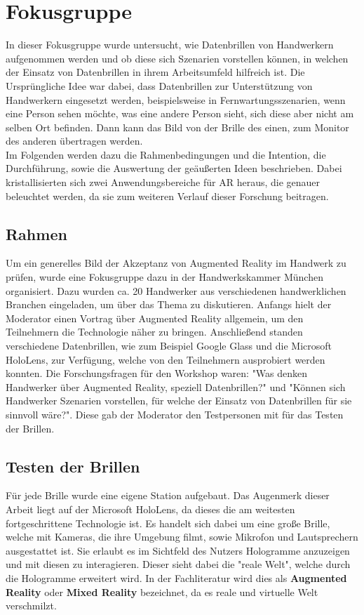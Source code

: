 \chapter{Fokusgruppe}

In dieser Fokusgruppe wurde untersucht, wie Datenbrillen von Handwerkern aufgenommen werden und ob diese sich Szenarien vorstellen können, in welchen der Einsatz von Datenbrillen in ihrem Arbeitsumfeld hilfreich ist. Die Ursprüngliche Idee war dabei, dass Datenbrillen zur Unterstützung von Handwerkern eingesetzt werden, beispielsweise in Fernwartungsszenarien, wenn eine Person sehen möchte, was eine andere Person sieht, sich diese aber nicht am selben Ort befinden. Dann kann das Bild von der Brille des einen, zum Monitor des anderen übertragen werden. \\
Im Folgenden werden dazu die Rahmenbedingungen und die Intention, die Durchführung, sowie die Auswertung der geäußerten Ideen beschrieben. Dabei kristallisierten sich zwei Anwendungsbereiche für AR heraus, die genauer beleuchtet werden, da sie zum weiteren Verlauf dieser Forschung beitragen.

\section{Rahmen}

Um ein generelles Bild der Akzeptanz von Augmented Reality im Handwerk zu prüfen, wurde eine Fokusgruppe dazu in der Handwerkskammer München organisiert. Dazu wurden ca. 20 Handwerker aus verschiedenen handwerklichen Branchen eingeladen, um über das Thema zu diskutieren. Anfangs hielt der Moderator einen Vortrag über Augmented Reality allgemein, um den Teilnehmern die Technologie näher zu bringen. Anschließend standen verschiedene Datenbrillen, wie zum Beispiel Google Glass und die Microsoft HoloLens, zur Verfügung, welche von den Teilnehmern ausprobiert werden konnten. Die Forschungsfragen für den Workshop waren: "Was denken Handwerker über Augmented Reality, speziell Datenbrillen?" und "Können sich Handwerker Szenarien vorstellen, für welche der Einsatz von Datenbrillen für sie sinnvoll wäre?". Diese gab der Moderator den Testpersonen mit für das Testen der Brillen.

\section{Testen der Brillen}

Für jede Brille wurde eine eigene Station aufgebaut. Das Augenmerk dieser Arbeit liegt auf der Microsoft HoloLens, da dieses die am weitesten fortgeschrittene Technologie ist. Es handelt sich dabei um eine große Brille, welche mit Kameras, die ihre Umgebung filmt, sowie Mikrofon und Lautsprechern ausgestattet ist. Sie erlaubt es im Sichtfeld des Nutzers Hologramme anzuzeigen und mit diesen zu interagieren. Dieser sieht dabei die "reale Welt", welche durch die Hologramme erweitert wird. In der Fachliteratur wird dies als \textbf{Augmented Reality} oder \textbf{Mixed Reality} bezeichnet, da es reale und virtuelle Welt verschmilzt.

